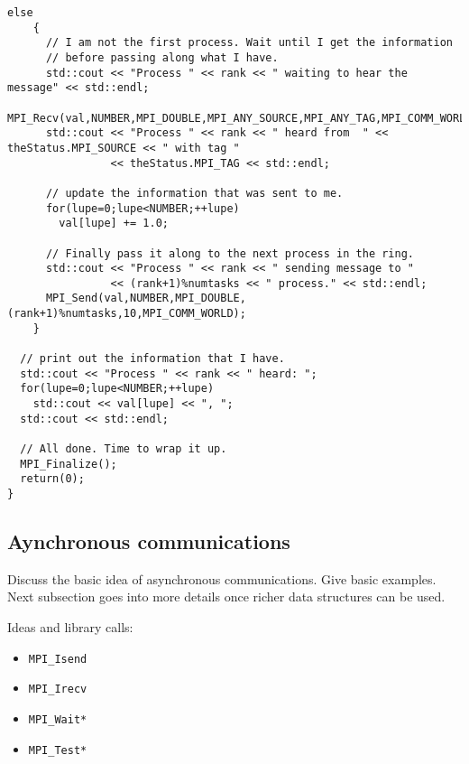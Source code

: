 \begin{lstlisting}[caption={Example of blocking communication.},
                   basicstyle=\scriptsize,
                   label=listing:blockingCommunication]
  else
    {
      // I am not the first process. Wait until I get the information
      // before passing along what I have.
      std::cout << "Process " << rank << " waiting to hear the message" << std::endl;
      MPI_Recv(val,NUMBER,MPI_DOUBLE,MPI_ANY_SOURCE,MPI_ANY_TAG,MPI_COMM_WORLD,&theStatus);
      std::cout << "Process " << rank << " heard from  " << theStatus.MPI_SOURCE << " with tag " 
                << theStatus.MPI_TAG << std::endl;

      // update the information that was sent to me.
      for(lupe=0;lupe<NUMBER;++lupe)
        val[lupe] += 1.0;

      // Finally pass it along to the next process in the ring.
      std::cout << "Process " << rank << " sending message to " 
                << (rank+1)%numtasks << " process." << std::endl;
      MPI_Send(val,NUMBER,MPI_DOUBLE,(rank+1)%numtasks,10,MPI_COMM_WORLD);
    }

  // print out the information that I have.
  std::cout << "Process " << rank << " heard: ";
  for(lupe=0;lupe<NUMBER;++lupe)
    std::cout << val[lupe] << ", ";
  std::cout << std::endl;

  // All done. Time to wrap it up.
  MPI_Finalize();
  return(0);
}
\end{lstlisting}

\subsection{Aynchronous communications}

\todo Discuss the basic idea of asynchronous communications. Give basic
examples. Next subsection goes into more details once richer data
structures can be used.

Ideas and library calls: \\
\begin{itemize}
\item \texttt{MPI\_Isend}
\item \texttt{MPI\_Irecv}
\item \texttt{MPI\_Wait*}
\item \texttt{MPI\_Test*}
\end{itemize}

